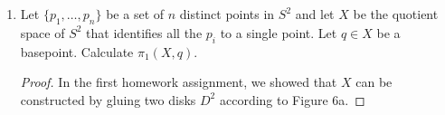 \documentclass{article}
\begin{document}
\begin{enumerate}[label={\bf Q\arabic*:}]
  \item Let $\{p_1,\ldots,p_n\}$ be a set of $n$ distinct points in $S^2$
    and let $X$ be the quotient space of $S^2$ that identifies all the
    $p_i$ to a single point. Let $q\in X$ be a basepoint. Calculate
    $\pi_1(X,q)$.

    \begin{proof}
      In the first homework assignment, we showed that $X$ can be
      constructed by gluing two disks $D^2$ according to Figure 6a.
    \end{proof}
\end{enumerate}
\end{document}
